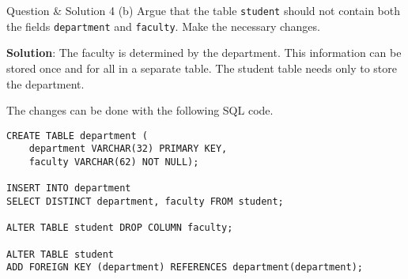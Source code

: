 \begin{frame}[fragile]{Question \& Solution 4 (b)}
Argue that the table \texttt{student} should not contain both the fields \texttt{department} and \texttt{faculty}. Make the necessary changes. \vspace{10pt}

\textbf{Solution}:
The faculty is determined by the department. This information can be stored once and for all in a separate table. The student table needs only to store the department. \vspace{10pt}

The changes can be done with the following SQL code.

\begin{lstlisting}
CREATE TABLE department (
	department VARCHAR(32) PRIMARY KEY,
	faculty VARCHAR(62) NOT NULL);

INSERT INTO department 
SELECT DISTINCT department, faculty FROM student;

ALTER TABLE student DROP COLUMN faculty;

ALTER TABLE student
ADD FOREIGN KEY (department) REFERENCES department(department);
\end{lstlisting}
\end{frame}


